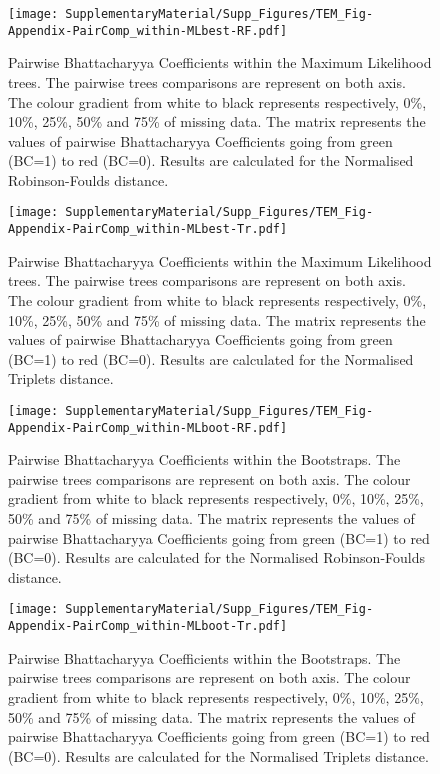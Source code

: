 \begin{figure} 
\centering
    \texttt{[image: SupplementaryMaterial/Supp\_Figures/TEM\_Fig-Appendix-PairComp\_within-MLbest-RF.pdf]}
\caption{Pairwise Bhattacharyya Coefficients within the Maximum Likelihood trees. The pairwise trees comparisons are represent on both axis. The colour gradient from white to black represents respectively, 0\%, 10\%, 25\%, 50\% and 75\% of missing data. The matrix represents the values of pairwise Bhattacharyya Coefficients going from green (BC=1) to red (BC=0). Results are calculated for the Normalised Robinson-Foulds distance.}
\label{Fig_pairComp-MLbest-RF}
\end{figure} %

\begin{figure} 
\centering
    \texttt{[image: SupplementaryMaterial/Supp\_Figures/TEM\_Fig-Appendix-PairComp\_within-MLbest-Tr.pdf]}
\caption{Pairwise Bhattacharyya Coefficients within the Maximum Likelihood trees. The pairwise trees comparisons are represent on both axis. The colour gradient from white to black represents respectively, 0\%, 10\%, 25\%, 50\% and 75\% of missing data. The matrix represents the values of pairwise Bhattacharyya Coefficients going from green (BC=1) to red (BC=0). Results are calculated for the Normalised Triplets distance.}
\label{Fig_pairComp-MLbest-Tr}
\end{figure} %

\begin{figure} 
\centering
    \texttt{[image: SupplementaryMaterial/Supp\_Figures/TEM\_Fig-Appendix-PairComp\_within-MLboot-RF.pdf]}
\caption{Pairwise Bhattacharyya Coefficients within the Bootstraps. The pairwise trees comparisons are represent on both axis. The colour gradient from white to black represents respectively, 0\%, 10\%, 25\%, 50\% and 75\% of missing data. The matrix represents the values of pairwise Bhattacharyya Coefficients going from green (BC=1) to red (BC=0). Results are calculated for the Normalised Robinson-Foulds distance.}
\label{Fig_pairComp-MLboot-RF}
\end{figure} %

\begin{figure} 
\centering
    \texttt{[image: SupplementaryMaterial/Supp\_Figures/TEM\_Fig-Appendix-PairComp\_within-MLboot-Tr.pdf]}
\caption{Pairwise Bhattacharyya Coefficients within the Bootstraps. The pairwise trees comparisons are represent on both axis. The colour gradient from white to black represents respectively, 0\%, 10\%, 25\%, 50\% and 75\% of missing data. The matrix represents the values of pairwise Bhattacharyya Coefficients going from green (BC=1) to red (BC=0). Results are calculated for the Normalised Triplets distance.}
\label{Fig_pairComp-MLboot-Tr}
\end{figure} %

